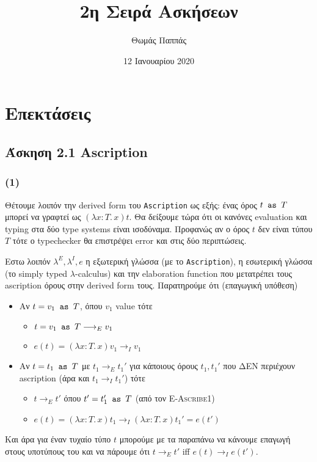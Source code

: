 \documentclass[a4paper,11pt]{article}
\newcommand\nlambda[1]{\ensuremath{\lambda #1.\,}}
\newcommand\nred{\ensuremath{\longrightarrow}}
\begin{document}
\title{2η Σειρά Ασκήσεων}
\author{Θωμάς Παππάς}
\date{12 Ιανουαρίου 2020}
\maketitle

\section{Επεκτάσεις}


\subsection*{Άσκηση 2.1  Ascription}

\subsubsection*{(1)}
Θέτουμε λοιπόν την derived form του \verb|Ascription| ως εξής: ένας όρος $t\verb| as |T$ μπορεί να γραφτεί ως $(\nlambda{x:T} x)t$.
Θα δείξουμε τώρα ότι οι κανόνες evaluation και typing στα δύο type systems είναι ισοδύναμα.
Προφανώς αν ο όρος $t$ δεν είναι τύπου $T$ τότε ο typechecker θα επιστρέψει error και στις δύο περιπτώσεις.

Εστω λοιπόν $\lambda^E, \lambda^I, e$ η εξωτερική γλώσσα (με το \verb|Ascription|), η εσωτερική γλώσσα (το simply typed $\lambda$-calculus) και την elaboration function που μετατρέπει τους ascription όρους στην derived form τους.
Παρατηρούμε ότι (επαγωγική υπόθεση)
\begin{itemize}
  \item Αν $t = v_1\verb| as |T$, όπου $v_1$ value τότε
    \begin{itemize}
      \item $t = v_1\verb| as |T \nred_E v_1$
      \item $e(t) = (\nlambda{x:T} x)v_1 \nred_I v_1$
    \end{itemize}
  \item Αν $t = t_1\verb| as |T$ με $t_1 \nred_E t_1'$ για κάποιους όρους $t_1,t_1'$ που ΔΕΝ περιέχουν ascription (άρα και $t_1 \nred_I t_1'$) τότε
    \begin{itemize}
      \item $t \nred_E t'$ όπου $t' = t_1'\verb| as |T$ (από τον \textsc{E-Ascribe1})
      \item $e(t) = (\nlambda{x:T} x)t_1 \nred_I (\nlambda{x:T} x)t_1' = e(t')$
    \end{itemize}
\end{itemize}
Και άρα για έναν τυχαίο τύπο $t$ μπορούμε με τα παραπάνω να κάνουμε επαγωγή στους υποτύπους του και να πάρουμε ότι $t \nred_E t'$ iff $e(t) \nred_I e(t')$.
\end{document}
